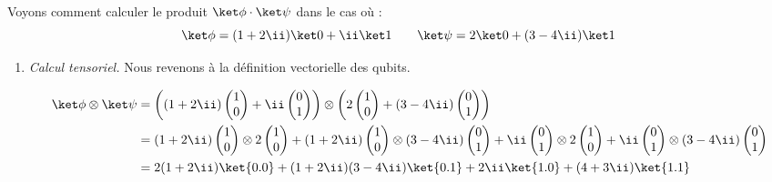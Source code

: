 \documentclass[11pt,class=report,crop=false]{standalone}
\begin{document}
\begin{exemple}
Voyons comment calculer le produit $\ket\phi \cdot \ket\psi$ dans le cas où :
$$\ket\phi = (1+2\ii)\ket0 + \ii\ket1\qquad
\ket\psi = 2\ket0 + (3-4\ii)\ket1$$

\begin{enumerate}
  \item \emph{Calcul tensoriel.} Nous revenons à la définition vectorielle des qubits.
  
\begin{align*}
\ket \phi \otimes \ket \psi
  &= \left((1+2\ii)\begin{pmatrix}1\\0\end{pmatrix} + \ii\begin{pmatrix}0\\1\end{pmatrix}\right) \otimes \left(2\begin{pmatrix}1\\0\end{pmatrix} + (3-4\ii)\begin{pmatrix}0\\1\end{pmatrix}\right)  \\
  &=  (1+2\ii)\begin{pmatrix}1\\0\end{pmatrix} \otimes 2\begin{pmatrix}1\\0\end{pmatrix} 
  + (1+2\ii)\begin{pmatrix}1\\0\end{pmatrix} \otimes (3-4\ii)\begin{pmatrix}0\\1\end{pmatrix}
  + \ii\begin{pmatrix}0\\1\end{pmatrix} \otimes 2\begin{pmatrix}1\\0\end{pmatrix} 
  + \ii\begin{pmatrix}0\\1\end{pmatrix} \otimes   (3-4\ii)\begin{pmatrix}0\\1\end{pmatrix} \\
  &= 2(1+2\ii) \ket{0.0} + (1+2\ii)(3-4\ii)\ket{0.1} + 2\ii\ket{1.0}+ (4+3\ii)\ket{1.1} \\
\end{align*}
  

\end{enumerate}
\end{exemple}
\end{document}
